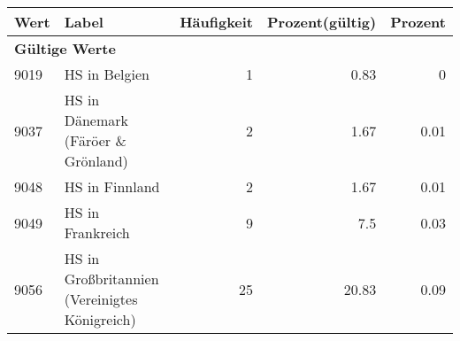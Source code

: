      \begin{longtable}{lXrrr}
     \toprule
     \textbf{Wert} & \textbf{Label} & \textbf{Häufigkeit} & \textbf{Prozent(gültig)} & \textbf{Prozent} \\
     \endhead
     \midrule
     \multicolumn{5}{l}{\textbf{Gültige Werte}}\\

     9019 &
     \multicolumn{1}{X}{ HS in Belgien   } &


       \num{1} &
       \num[round-mode=places,round-precision=2]{0.83} &
         \num[round-mode=places,round-precision=2]{0} \\

     9037 &
     \multicolumn{1}{X}{ HS in Dänemark (Färöer \& Grönland)   } &


       \num{2} &
       \num[round-mode=places,round-precision=2]{1.67} &
         \num[round-mode=places,round-precision=2]{0.01} \\

     9048 &
     \multicolumn{1}{X}{ HS in Finnland   } &


       \num{2} &
       \num[round-mode=places,round-precision=2]{1.67} &
         \num[round-mode=places,round-precision=2]{0.01} \\

     9049 &
     \multicolumn{1}{X}{ HS in Frankreich   } &


       \num{9} &
       \num[round-mode=places,round-precision=2]{7.5} &
         \num[round-mode=places,round-precision=2]{0.03} \\

     9056 &
     \multicolumn{1}{X}{ HS in Großbritannien (Vereinigtes Königreich)   } &


       \num{25} &
       \num[round-mode=places,round-precision=2]{20.83} &
         \num[round-mode=places,round-precision=2]{0.09} \\


\end{longtable}

